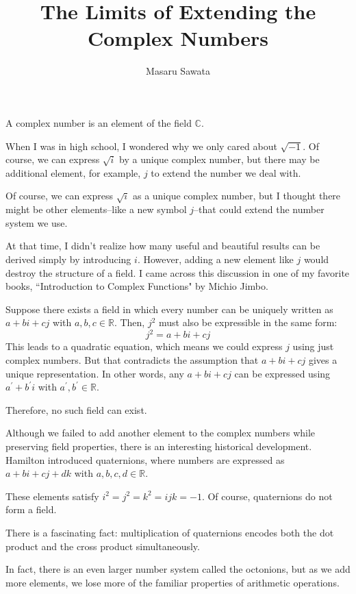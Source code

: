 \documentclass[letterpaper, 12pt]{article}
\title{The Limits of Extending the Complex Numbers}
\author{Masaru Sawata}
\theoremstyle{custom}
\begin{document}
\maketitle
A complex number is an element of the field $\mathbb{C}$.

When I was in high school, I wondered why we only cared about  $\sqrt{-1}$.
Of course, we can express $\sqrt{i}$ by a unique complex number, 
but there may be additional element, for example, $j$ to extend the number we deal with.

Of course, we can express $\sqrt{i}$ as a unique complex number,
but I thought there might be other elements--like a new symbol 
$j$--that could extend the number system we use.


At that time, I didn't realize how many useful and beautiful results can be derived simply by introducing $i$.
However, adding a new element like $j$ would destroy the structure of a field.
I came across this discussion in one of my favorite books, ``Introduction to Complex Functions" by Michio Jimbo.

Suppose there exists a field in which every number can be uniquely written as $a+bi+cj$ with $a,b,c \in \mathbb{R}$.
Then, $j^2$ must also be expressible in the same form:
\begin{equation*}
  j^2 = a + bi + cj
\end{equation*}
This leads to a quadratic equation, which means we could express $j$ using just complex numbers.
But that contradicts the assumption that $a+bi+cj$ gives a unique representation.
In other words, any $a+bi+cj$ can be expressed using $a^\prime + b^\prime i$ with $a^\prime, b^\prime \in \mathbb{R}$.

Therefore, no such field can exist.

Although we failed to add another element to the complex numbers while preserving field properties, there is an interesting historical development.
Hamilton introduced quaternions, where numbers are expressed as $a+bi+cj+dk$ with $a,b,c,d \in \mathbb{R}$.

These elements satisfy $i^2 = j^2 = k^2 = ijk = -1$.
Of course, quaternions do not form a field.

There is a fascinating fact: multiplication of quaternions encodes both the dot product and the cross product simultaneously.

In fact, there is an even larger number system called the octonions,
but as we add more elements, we lose more of the familiar properties of arithmetic operations.
\end{document}
